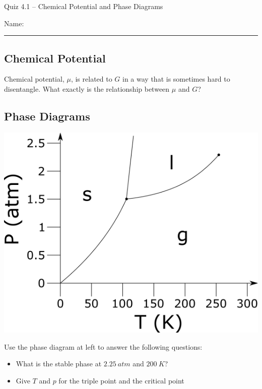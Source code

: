\documentclass[11pt, letterpaper]{memoir}
\begin{document}
	\begin{center}
		{\large Quiz 4.1 -- Chemical Potential and Phase Diagrams}
	\end{center}
	{\large Name: \rule[-1mm]{4in}{.1pt} 
		
\subsection*{Chemical Potential}
Chemical potential, $\mu$, is related to $G$ in a way that is sometimes hard to disentangle. What exactly is the relationship between $\mu$ and $G$?

\vspace{4em}
\subsection*{Phase Diagrams}

\hspace{-3em}
\begin{minipage}{0.4\linewidth}
	\includegraphics[width=\textwidth]{Phase_Diagram}
\end{minipage}
\begin{minipage}{0.7\linewidth}
	Use the phase diagram at left to answer the following questions:
	
	\noindent
	\begin{itemize}
		\item What is the stable phase at $2.25~atm$ and $200~K$?
		\item Give $T$ and $p$ for the triple point and the critical point
		

\end{itemize}
\end{minipage}}
\end{document}
